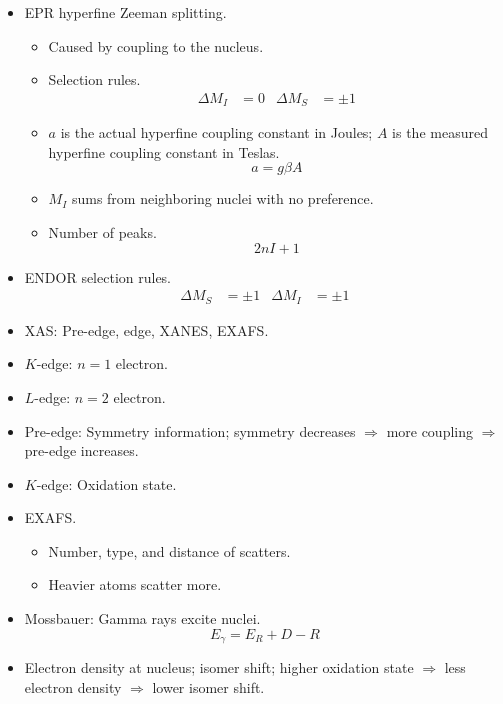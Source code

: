 \documentclass[../notes.tex]{subfiles}
\begin{document}
\begin{itemize}
\begin{itemize}
    \end{itemize}
    \item EPR hyperfine Zeeman splitting.
    \begin{itemize}
        \item Caused by coupling to the nucleus.
        \item Selection rules.
        \begin{align*}
            \Delta M_I &= 0&
            \Delta M_S &= \pm 1
        \end{align*}
        \item $a$ is the actual hyperfine coupling constant in Joules; $A$ is the measured hyperfine coupling constant in Teslas.
        \begin{equation*}
            a = g\beta A
        \end{equation*}
        \item $M_I$ sums from neighboring nuclei with no preference.
        \item Number of peaks.
        \begin{equation*}
            2nI+1
        \end{equation*}
    \end{itemize}
    \item ENDOR selection rules.
    \begin{align*}
        \Delta M_S &= \pm 1&
        \Delta M_I &= \pm 1
    \end{align*}
    \item XAS: Pre-edge, edge, XANES, EXAFS.
    \item $K$-edge: $n=1$ electron.
    \item $L$-edge: $n=2$ electron.
    \item Pre-edge: Symmetry information; symmetry decreases $\Rightarrow$ more coupling $\Rightarrow$ pre-edge increases.
    \item $K$-edge: Oxidation state.
    \item EXAFS.
    \begin{itemize}
        \item Number, type, and distance of scatters.
        \item Heavier atoms scatter more.
    \end{itemize}
    \item Mossbauer: Gamma rays excite nuclei.
    \begin{equation*}
        E_\gamma = E_R+D-R
    \end{equation*}
    \item Electron density at nucleus; isomer shift; higher oxidation state $\Rightarrow$ less electron density $\Rightarrow$ lower isomer shift.

\end{itemize}
\end{document}
